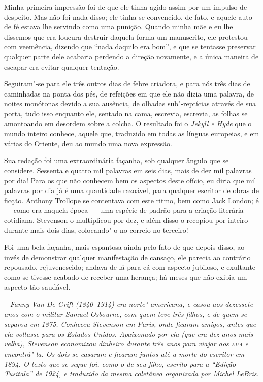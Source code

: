 Minha primeira impressão foi de que ele tinha agido assim por um impulso
de despeito.  Mas não foi nada disso; ele tinha se convencido, de
fato, e aquele auto de fé estava lhe servindo como uma punição.  Quando
minha mãe e eu lhe dissemos que era loucura destruir daquela forma um
manuscrito, ele protestou com veemência, dizendo que “nada daquilo era
bom”, e que se tentasse preservar qualquer parte dele acabaria perdendo
a direção novamente, e a única maneira de escapar era evitar qualquer
tentação.

Seguiram"-se para ele três outros dias de febre criadora, e para nós três
dias de caminhadas na ponta dos pés, de refeições em que ele não dizia
uma palavra, de noites monótonas devido a sua ausência, de olhadas
sub"-reptícias através de sua porta, tudo isso enquanto ele, sentado na
cama, escrevia, escrevia, as folhas se amontoando em desordem sobre a
colcha. O resultado foi o \textit{Jekyll e Hyde} que o mundo
inteiro conhece, aquele que, traduzido em todas as línguas europeias, e
em várias do Oriente, deu ao mundo uma nova expressão.

Sua redação foi uma extraordinária façanha, sob qualquer ângulo que se
considere.  Sessenta e quatro mil palavras em seis dias, mais de dez
mil palavras por dia!  Para os que não conhecem bem os aspectos deste
ofício, eu diria que mil palavras por dia já é uma quantidade razoável,
para qualquer escritor de obras de ficção.  Anthony Trollope se
contentava com este ritmo, bem como Jack London; é --- como era naquela
época --- uma espécie de padrão para a criação literária cotidiana. 
Stevenson o multiplicou por dez, e além disso o recopiou por inteiro
durante mais dois dias, colocando"-o no correio no terceiro!

Foi uma bela façanha, mais espantosa ainda pelo fato de que depois
disso, ao invés de demonstrar qualquer manifestação de cansaço, ele
parecia ao contrário repousado, rejuvenescido; andava de lá para cá com
aspecto jubiloso, e exultante como se tivesse acabado de receber uma
herança; há meses que não exibia um aspecto tão saudável. 


\clearpage
\ifodd\thepage ~ \clearpage\else\relax\fi
\thispagestyle{empty}
\mbox{}\vfill
{\noindent\itshape Fanny Van De Grift (1840--1914) era norte"-americana, e casou aos
dezessete anos com o militar Samuel Osbourne, com quem teve três
filhos, e de quem se separou em 1875.  Conheceu Stevenson em
Paris, onde ficaram amigos, antes que ela voltasse para os Estados
Unidos.  Apaixonado por ela (que era dez anos mais velha), Stevenson
economizou dinheiro durante três anos para viajar aos \emph{\textsc{eua}} e
encontrá"-la.  Os dois se casaram e ficaram juntos até a morte do
escritor em 1894. O texto que se segue foi, como o de seu filho,
escrito para a “Edição Tusitala” de 1924, e traduzido da mesma
coletânea organizada por Michel LeBris.}

